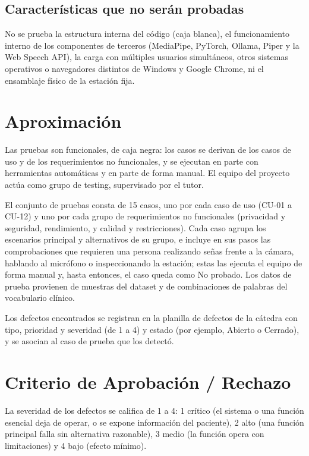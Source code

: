 \documentclass[12pt, a4paper]{article}
\begin{document}
\subsection{Características que no serán probadas}

No se prueba la estructura interna del código (caja blanca), el funcionamiento
interno de los componentes de terceros (MediaPipe, PyTorch, Ollama, Piper y la
Web Speech API), la carga con múltiples usuarios simultáneos, otros sistemas
operativos o navegadores distintos de Windows y Google Chrome, ni el
ensamblaje físico de la estación fija.

\section{Aproximación}

Las pruebas son funcionales, de caja negra: los casos se derivan de los casos
de uso y de los requerimientos no funcionales, y se ejecutan en parte con
herramientas automáticas y en parte de forma manual. El equipo del proyecto
actúa como grupo de testing, supervisado por el tutor.

El conjunto de pruebas consta de 15 casos, uno por cada caso de uso (CU-01 a
CU-12) y uno por cada grupo de requerimientos no funcionales (privacidad y
seguridad, rendimiento, y calidad y restricciones). Cada caso agrupa los
escenarios principal y alternativos de su grupo, e incluye en sus pasos las
comprobaciones que requieren una persona realizando señas frente a la cámara,
hablando al micrófono o inspeccionando la estación; estas las ejecuta el equipo
de forma manual y, hasta entonces, el caso queda como No probado. Los datos de prueba provienen de muestras del dataset y de
combinaciones de palabras del vocabulario clínico.

Los defectos encontrados se registran en la planilla de defectos de la cátedra
con tipo, prioridad y severidad (de 1 a 4) y estado (por ejemplo, Abierto o
Cerrado), y se asocian al caso de prueba que los detectó.

\section{Criterio de Aprobación / Rechazo}

La severidad de los defectos se califica de 1 a 4: 1 crítico (el sistema o una
función esencial deja de operar, o se expone información del paciente), 2 alto
(una función principal falla sin alternativa razonable), 3 medio (la función
opera con limitaciones) y 4 bajo (efecto mínimo).
\end{document}
